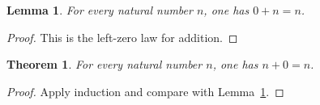 \documentclass{article}
\newtheorem{theorem}{Theorem}
\newtheorem{lemma}{Lemma}
\begin{document}
\begin{lemma}\label{lem:zero-add}
For every natural number $n$, one has $0+n=n$.
\end{lemma}
\begin{proof}
This is the left-zero law for addition.
\end{proof}

\begin{theorem}\label{thm:add-zero}
For every natural number $n$, one has $n+0=n$.
\end{theorem}
\begin{proof}
Apply induction and compare with Lemma~\ref{lem:zero-add}.
\end{proof}
\end{document}
